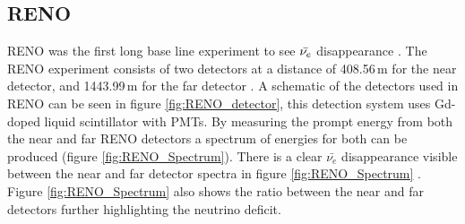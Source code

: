 \subsection{RENO} \label{subSec:reno}
RENO was the first long base line experiment to see $\Bar{\nu_e}$ disappearance \cite{Olive_2014}. The RENO experiment consists of two detectors at a distance of 408.56\,m for the near detector, and 1443.99\,m for the far detector \cite{reno_may_2012}. A schematic of the detectors used in RENO can be seen in figure \ref{fig:RENO_detector}, this detection system uses Gd-doped liquid scintillator with PMTs. By measuring the prompt energy from both the near and far RENO detectors a spectrum of energies for both can be produced (figure \ref{fig:RENO_Spectrum}). There is a clear $\bar{\nu_e}$ disappearance visible between the near and far detector spectra in figure \ref{fig:RENO_Spectrum} \cite{reno_may_2012}. Figure \ref{fig:RENO_Spectrum} also shows the ratio between the near and far detectors further highlighting the neutrino deficit. 

